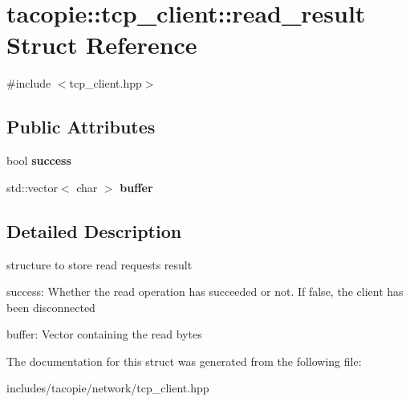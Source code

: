 \hypertarget{structtacopie_1_1tcp__client_1_1read__result}{}\section{tacopie\+:\+:tcp\+\_\+client\+:\+:read\+\_\+result Struct Reference}
\label{structtacopie_1_1tcp__client_1_1read__result}


{\ttfamily \#include $<$tcp\+\_\+client.\+hpp$>$}

\subsection*{Public Attributes}
\begin{DoxyCompactItemize}
\item 
\mbox{\label{structtacopie_1_1tcp__client_1_1read__result_a9bb917b8d210159a95655a6f8da8e96e}} 
bool {\bfseries success}
\item 
\mbox{\label{structtacopie_1_1tcp__client_1_1read__result_a50d22ea3a43d085d88d54bbf59a357dc}} 
std\+::vector$<$ char $>$ {\bfseries buffer}
\end{DoxyCompactItemize}


\subsection{Detailed Description}
structure to store read requests result
\begin{DoxyItemize}
\item success\+: Whether the read operation has succeeded or not. If false, the client has been disconnected
\item buffer\+: Vector containing the read bytes 
\end{DoxyItemize}

The documentation for this struct was generated from the following file\+:\begin{DoxyCompactItemize}
\item 
includes/tacopie/network/tcp\+\_\+client.\+hpp\end{DoxyCompactItemize}

